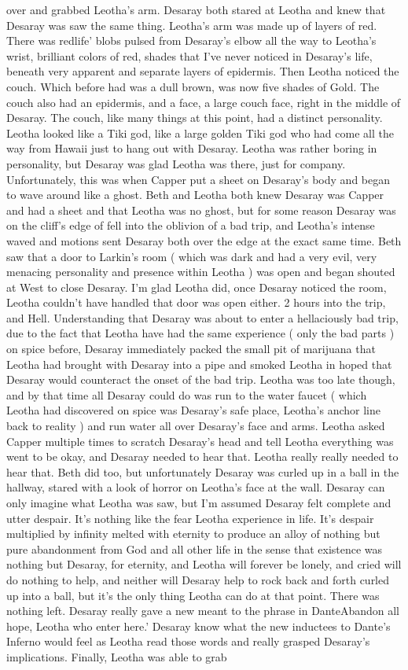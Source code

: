\documentclass[12pt]{book}
\begin{document}
over and grabbed Leotha's arm. Desaray both stared at Leotha and knew that Desaray was saw the same thing. Leotha's arm was made up of layers of red. There was redlife' blobs pulsed from Desaray's elbow all the way to Leotha's wrist, brilliant colors of red, shades that I've never noticed in Desaray's life, beneath very apparent and separate layers of epidermis. Then Leotha noticed the couch. Which before had was a dull brown, was now five shades of Gold. The couch also had an epidermis, and a face, a large couch face, right in the middle of Desaray. The couch, like many things at this point, had a distinct personality. Leotha looked like a Tiki god, like a large golden Tiki god who had come all the way from Hawaii just to hang out with Desaray. Leotha was rather boring in personality, but Desaray was glad Leotha was there, just for company. Unfortunately, this was when Capper put a sheet on Desaray's body and began to wave around like a ghost. Beth and Leotha both knew Desaray was Capper and had a sheet and that Leotha was no ghost, but for some reason Desaray was on the cliff's edge of fell into the oblivion of a bad trip, and Leotha's intense waved and motions sent Desaray both over the edge at the exact same time. Beth saw that a door to Larkin's room ( which was dark and had a very evil, very menacing personality and presence within Leotha ) was open and began shouted at West to close Desaray. I'm glad Leotha did, once Desaray noticed the room, Leotha couldn't have handled that door was open either. 2 hours into the trip, and Hell. Understanding that Desaray was about to enter a hellaciously bad trip, due to the fact that Leotha have had the same experience ( only the bad parts ) on spice before, Desaray immediately packed the small pit of marijuana that Leotha had brought with Desaray into a pipe and smoked Leotha in hoped that Desaray would counteract the onset of the bad trip. Leotha was too late though, and by that time all Desaray could do was run to the water faucet ( which Leotha had discovered on spice was Desaray's safe place, Leotha's anchor line back to reality ) and run water all over Desaray's face and arms. Leotha asked Capper multiple times to scratch Desaray's head and tell Leotha everything was went to be okay, and Desaray needed to hear that. Leotha really really needed to hear that. Beth did too, but unfortunately Desaray was curled up in a ball in the hallway, stared with a look of horror on Leotha's face at the wall. Desaray can only imagine what Leotha was saw, but I'm assumed Desaray felt complete and utter despair. It's nothing like the fear Leotha experience in life. It's despair multiplied by infinity melted with eternity to produce an alloy of nothing but pure abandonment from God and all other life in the sense that existence was nothing but Desaray, for eternity, and Leotha will forever be lonely, and cried will do nothing to help, and neither will Desaray help to rock back and forth curled up into a ball, but it's the only thing Leotha can do at that point. There was nothing left. Desaray really gave a new meant to the phrase in DanteAbandon all hope, Leotha who enter here.' Desaray know what the new inductees to Dante's Inferno would feel as Leotha read those words and really grasped Desaray's implications. Finally, Leotha was able to grab 
\end{document}
